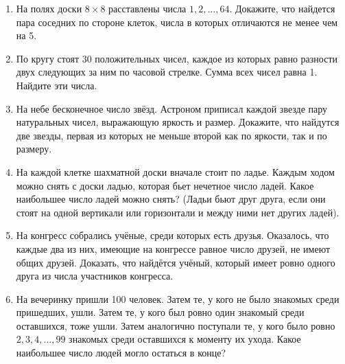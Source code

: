 \documentclass{article}
\begin{document}
\begin{enumerate}[label*=\protect\fbox{\arabic{enumi}}]
\item На полях доски $8 \times 8$ расставлены числа $1, 2, \dots, 64$. Докажите, что найдется пара соседних по стороне клеток, числа в которых отличаются не менее чем на 5.

\item По кругу стоят 30 положительных чисел, каждое из которых равно разности двух следующих за ним по часовой стрелке. Сумма всех чисел равна 1. Найдите эти числа.

\item На небе бесконечное число звёзд. Астроном приписал каждой звезде пару натуральных чисел, выражающую яркость и размер. Докажите, что найдутся две звезды, первая из которых не меньше второй как по яркости, так и по размеру.

\item На каждой клетке шахматной доски вначале стоит по ладье. Каждым ходом можно снять с доски ладью, которая бьет нечетное число ладей. Какое наибольшее число ладей можно снять? (Ладьи бьют друг друга, если они стоят на одной вертикали или горизонтали и между ними нет других ладей).

\item На конгресс собрались учёные, среди которых есть друзья. Оказалось, что каждые два из них, имеющие на конгрессе равное число друзей, не имеют общих друзей. Доказать, что найдётся учёный, который имеет ровно одного друга из числа участников конгресса.

\item На вечеринку пришли 100 человек. Затем те, у кого не было знакомых среди пришедших, ушли. Затем те, у кого был ровно один знакомый среди оставшихся, тоже ушли. Затем аналогично поступали те, у кого было ровно $2, 3, 4, \dots, 99$ знакомых среди оставшихся к моменту их ухода. 
Какое наибольшее число людей могло остаться в конце?
	
	
\end{enumerate}
\end{document}
